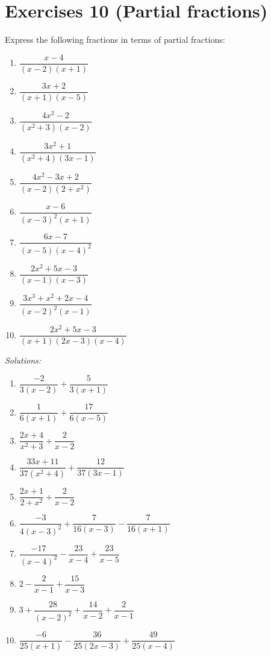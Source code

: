 \documentclass[
  12pt,
  oneside]{book}
\providecommand{\tightlist}{%
  \setlength{\itemsep}{0pt}\setlength{\parskip}{0pt}}
\theoremstyle{definition}
\theoremstyle{definition}
\theoremstyle{definition}
\theoremstyle{definition}
\theoremstyle{remark}
\begin{document}
\hypertarget{exercises-10-partial-fractions}{%
\chapter*{Exercises 10 (Partial fractions)}\label{exercises-10-partial-fractions}}

Express the following fractions in terms of partial fractions:

\begin{enumerate}
\def\labelenumi{\roman{enumi})}
\tightlist
\item
  \(\dfrac{x-4}{(x-2)(x+1)}\)
\item
  \(\dfrac{3x+2}{(x+1)(x-5)}\)
\item
  \(\dfrac{4x^2-2}{(x^2+3)(x-2)}\)
\item
  \(\dfrac{3x^2+1}{(x^2+4)(3x-1)}\)
\item
  \(\dfrac{4x^2-3x+2}{(x-2)(2+x^2)}\)
\item
  \(\dfrac{x-6}{(x-3)^2(x+1)}\)
\item
  \(\dfrac{6x-7}{(x-5)(x-4)^2}\)
\item
  \(\dfrac{2x^2+5x-3}{(x-1)(x-3)}\)
\item
  \(\dfrac{3x^3+x^2+2x-4}{(x-2)^2(x-1)}\)
\item
  \(\dfrac{2x^2+5x-3}{(x+1)(2x-3)(x-4)}\)
\end{enumerate}

\emph{Solutions:}

\begin{enumerate}
\def\labelenumi{\roman{enumi})}
\tightlist
\item
  \(\dfrac{-2}{3(x-2)}+\dfrac 5{3(x+1)}\)
\item
  \(\dfrac 1{6(x+1)}+\dfrac{17}{6(x-5)}\)
\item
  \(\dfrac{2x+4}{x^2+3}+\dfrac 2{x-2}\)
\item
  \(\dfrac{33x+11}{37(x^2+4)}+\dfrac{12}{37(3x-1)}\)
\item
  \(\dfrac{2x+1}{2+x^2}+\dfrac 2{x-2}\)
\item
  \(\dfrac{-3}{4(x-3)^2}+\dfrac 7{16(x-3)}-\dfrac 7{16(x+1)}\)
\item
  \(\dfrac{-17}{(x-4)^2}-\dfrac{23}{x-4}+\dfrac{23}{x-5}\)
\item
  \(2-\dfrac 2{x-1}+\dfrac{15}{x-3}\)
\item
  \(3+\dfrac{28}{(x-2)^2}+\dfrac{14}{x-2}+\dfrac 2{x-1}\)
\item
  \(\dfrac{-6}{25(x+1)}-\dfrac{36}{25(2x-3)}+\dfrac{49}{25(x-4)}\)
\end{enumerate}
\end{document}
